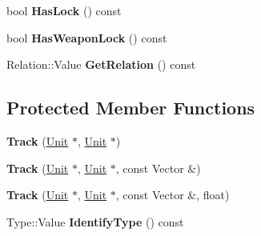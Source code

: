 \begin{DoxyCompactItemize}
\item 
bool {\bfseries Has\+Lock} () const \hypertarget{classRadar_1_1Track_ae4893fd5801e1d7ddaf73a4036036d66}{}\label{classRadar_1_1Track_ae4893fd5801e1d7ddaf73a4036036d66}

\item 
bool {\bfseries Has\+Weapon\+Lock} () const \hypertarget{classRadar_1_1Track_add704be359b8454144b87a5759ae7712}{}\label{classRadar_1_1Track_add704be359b8454144b87a5759ae7712}

\item 
Relation\+::\+Value {\bfseries Get\+Relation} () const \hypertarget{classRadar_1_1Track_a9a2817ce31ef6158c7f069179c5f88a6}{}\label{classRadar_1_1Track_a9a2817ce31ef6158c7f069179c5f88a6}

\end{DoxyCompactItemize}
\subsection*{Protected Member Functions}
\begin{DoxyCompactItemize}
\item 
{\bfseries Track} (\hyperlink{classUnit}{Unit} $\ast$, \hyperlink{classUnit}{Unit} $\ast$)\hypertarget{classRadar_1_1Track_a38fd14ba5a76871349849c07bba6fab3}{}\label{classRadar_1_1Track_a38fd14ba5a76871349849c07bba6fab3}

\item 
{\bfseries Track} (\hyperlink{classUnit}{Unit} $\ast$, \hyperlink{classUnit}{Unit} $\ast$, const Vector \&)\hypertarget{classRadar_1_1Track_a0d3c0333eef50e293d534e0d74a5cc4c}{}\label{classRadar_1_1Track_a0d3c0333eef50e293d534e0d74a5cc4c}

\item 
{\bfseries Track} (\hyperlink{classUnit}{Unit} $\ast$, \hyperlink{classUnit}{Unit} $\ast$, const Vector \&, float)\hypertarget{classRadar_1_1Track_ac75d47dca5b7a8a34572caa553f9b736}{}\label{classRadar_1_1Track_ac75d47dca5b7a8a34572caa553f9b736}

\item 
Type\+::\+Value {\bfseries Identify\+Type} () const \hypertarget{classRadar_1_1Track_a1183a156e60b075671ae20bda0bf2b32}{}\label{classRadar_1_1Track_a1183a156e60b075671ae20bda0bf2b32}

\end{DoxyCompactItemize}
